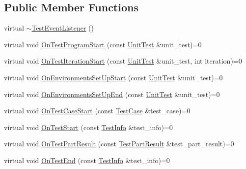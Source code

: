 \subsection*{Public Member Functions}
\begin{DoxyCompactItemize}
\item 
virtual \mbox{\hyperlink{classtesting_1_1_test_event_listener_a4512d19e7a108ec4926239ec1ea85d63}{$\sim$\+Test\+Event\+Listener}} ()
\item 
virtual void \mbox{\hyperlink{classtesting_1_1_test_event_listener_a5f6c84f39851e8a603a2d2e10063816b}{On\+Test\+Program\+Start}} (const \mbox{\hyperlink{classtesting_1_1_unit_test}{Unit\+Test}} \&unit\+\_\+test)=0
\item 
virtual void \mbox{\hyperlink{classtesting_1_1_test_event_listener_a60cc09b7907cb329d152eb5e7133bdeb}{On\+Test\+Iteration\+Start}} (const \mbox{\hyperlink{classtesting_1_1_unit_test}{Unit\+Test}} \&unit\+\_\+test, int iteration)=0
\item 
virtual void \mbox{\hyperlink{classtesting_1_1_test_event_listener_aa6502e534919605be45f26a6daf9a40c}{On\+Environments\+Set\+Up\+Start}} (const \mbox{\hyperlink{classtesting_1_1_unit_test}{Unit\+Test}} \&unit\+\_\+test)=0
\item 
virtual void \mbox{\hyperlink{classtesting_1_1_test_event_listener_aaa1021d75f5dbf3f05c829c1cc520341}{On\+Environments\+Set\+Up\+End}} (const \mbox{\hyperlink{classtesting_1_1_unit_test}{Unit\+Test}} \&unit\+\_\+test)=0
\item 
virtual void \mbox{\hyperlink{classtesting_1_1_test_event_listener_ab4ed885d63f5bbff8076c1329b3dfe36}{On\+Test\+Case\+Start}} (const \mbox{\hyperlink{classtesting_1_1_test_case}{Test\+Case}} \&test\+\_\+case)=0
\item 
virtual void \mbox{\hyperlink{classtesting_1_1_test_event_listener_ab4f6a0ca16ae75daf385b3b5914e1048}{On\+Test\+Start}} (const \mbox{\hyperlink{classtesting_1_1_test_info}{Test\+Info}} \&test\+\_\+info)=0
\item 
virtual void \mbox{\hyperlink{classtesting_1_1_test_event_listener_a054f8705c883fa120b91473aff38f2ee}{On\+Test\+Part\+Result}} (const \mbox{\hyperlink{classtesting_1_1_test_part_result}{Test\+Part\+Result}} \&test\+\_\+part\+\_\+result)=0
\item 
virtual void \mbox{\hyperlink{classtesting_1_1_test_event_listener_abb1c44525ef038500608b5dc2f17099b}{On\+Test\+End}} (const \mbox{\hyperlink{classtesting_1_1_test_info}{Test\+Info}} \&test\+\_\+info)=0
\item 

\end{DoxyCompactItemize}
